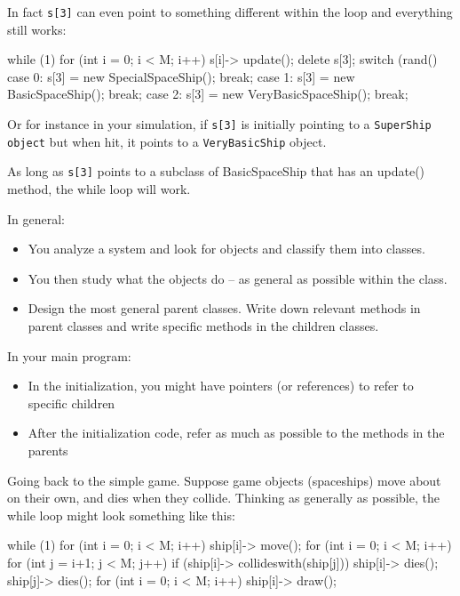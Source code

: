 In fact \verb!s[3]! can even point to something different within the loop
and everything still works:

\begin{console}
while (1)
{   
    for (int i = 0; i < M; i++)
    {   
        s[i]-> update();
    }
    delete s[3];
    switch (rand() %
    {   
        case 0: s[3] = new SpecialSpaceShip(); break;
        case 1: s[3] = new BasicSpaceShip(); break;
        case 2: s[3] = new VeryBasicSpaceShip(); break;
    }
}
\end{console}

Or for instance in your simulation, if \verb!s[3]! is initially pointing to a \verb!SuperShip object! but when hit, it points to a \verb!VeryBasicShip! object.

As long as \verb!s[3]! points to a subclass of BasicSpaceShip that has an update() method, the while loop will work.

In general:

\begin{itemize}
\item
  You analyze a system and look for objects and classify them into
  classes.
\item
  You then study what the objects do -- as general as possible within
  the class.
\item
  Design the most general parent classes. Write down relevant methods in
  parent classes and write specific methods in the children classes.
\end{itemize}

In your main program:

\begin{itemize}
\item
  In the initialization, you might have pointers (or references) to
  refer to specific children
\item
  After the initialization code, refer as much as possible to the
  methods in the parents
\end{itemize}

Going back to the simple game. Suppose game objects (spaceships) move about on their own, and dies when they collide. Thinking as generally as possible, the while loop might look something like this:

\begin{console}
while (1)
{   
    for (int i = 0; i < M; i++) ship[i]-> move();
    for (int i = 0; i < M; i++)
    {
        for (int j = i+1; j < M; j++)
        if (ship[i]-> collideswith(ship[j]))
        {   
            ship[i]-> dies();
            ship[j]-> dies();
        }
    }
    for (int i = 0; i < M; i++) ship[i]-> draw();
} 
\end{console}

